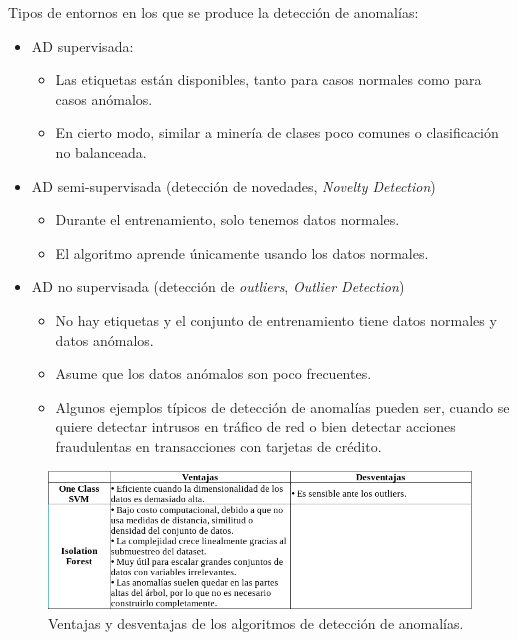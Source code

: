\documentclass[a4paper,12pt]{article}
\begin{document}
Tipos de entornos en los que se produce la detección de anomalías:
\begin{itemize}[noitemsep, topsep=2pt]
	\item AD supervisada:
	\begin{itemize}[noitemsep, topsep=2pt]
		\item Las etiquetas están disponibles, tanto para casos normales como para casos anómalos.
		\item En cierto modo, similar a minería de clases poco comunes o clasificación no balanceada.
	\end{itemize}
	\item AD semi-supervisada (detección de novedades, \textit{Novelty Detection})
	\begin{itemize}[noitemsep, topsep=2pt]
		\item Durante el entrenamiento, solo tenemos datos normales.
		\item El algoritmo aprende únicamente usando los datos normales.
	\end{itemize}
	\item AD no supervisada (detección de \textit{outliers}, \textit{Outlier Detection})
	\begin{itemize}[noitemsep, topsep=2pt]
		\item No hay etiquetas y el conjunto de entrenamiento tiene datos normales y datos anómalos.
		\item Asume que los datos anómalos son poco frecuentes.
		\item Algunos ejemplos típicos de detección de anomalías pueden ser, cuando se quiere detectar intrusos en tráfico de red o bien detectar acciones fraudulentas en transacciones con tarjetas de crédito.
	\end{itemize}
\end{itemize}

\begin{figure}[H]
	\begin{center}				
	\includegraphics[width=1\textwidth]{tesis_11.png}
  	\caption{Ventajas y desventajas de los algoritmos de detección de anomalías.}
  	\label{fig:proconsanomaly.}
  	\end{center}
\end{figure}
\end{document}
